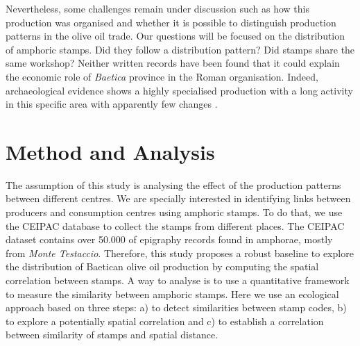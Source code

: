 \documentclass[review]{elsarticle}
\newcommand{\memo}[2]{\textcolor{#1}{#2}}
\newcommand{\xavi}[1]{\memo{magenta}{XRC: #1\\}}
\begin{document}
Nevertheless, some challenges remain under discussion such as how this production was organised and whether it is possible to distinguish production patterns in the olive oil trade. Our questions will be focused on the distribution of amphoric stamps. Did they follow a distribution pattern? Did stamps share the same workshop? Neither written records have been found that it could explain the economic role of \textit{Baetica} province in the Roman organisation. Indeed, archaeological evidence shows a highly specialised production with a long activity in this specific area with apparently few changes \citep{remesal_anforas_2004}. 






\section{Method and Analysis}

The assumption of this study is analysing the effect of the production patterns between different centres. We are specially interested in identifying links between producers and consumption centres using amphoric stamps. To do that, we use the CEIPAC database to collect the stamps from different places. The CEIPAC dataset contains over 50.000 of epigraphy records found in amphorae, mostly from \textit{Monte Testaccio}. Therefore, this study proposes a robust baseline to explore the distribution of Baetican olive oil production by computing the spatial correlation between stamps. A way to analyse is to use a quantitative framework to measure the similarity between amphoric stamps. Here we use an ecological approach based on three steps: a) to detect similarities between stamp codes, b) to explore a potentially spatial correlation and c) to establish a correlation between similarity of stamps and spatial distance. 
\end{document}
